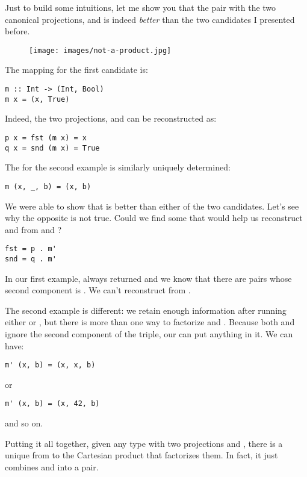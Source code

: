 Just to build some intuitions, let me show you that the pair
 with the two canonical projections, 
and  is indeed \emph{better} than the two candidates I
presented before.

\begin{figure}[H]
\centering
\texttt{[image: images/not-a-product.jpg]}
\end{figure}

\noindent
The mapping  for the first candidate is:

\begin{Verbatim}
m :: Int -> (Int, Bool)
m x = (x, True)
\end{Verbatim}
Indeed, the two projections,  and  can be
reconstructed as:

\begin{Verbatim}
p x = fst (m x) = x
q x = snd (m x) = True
\end{Verbatim}
The  for the second example is similarly uniquely determined:

\begin{Verbatim}
m (x, _, b) = (x, b)
\end{Verbatim}
We were able to show that  is better than either of
the two candidates. Let's see why the opposite is not true. Could we
find some  that would help us reconstruct 
and  from  and ?

\begin{Verbatim}
fst = p . m'
snd = q . m'
\end{Verbatim}
In our first example,  always returned  and we
know that there are pairs whose second component is . We
can't reconstruct  from .

The second example is different: we retain enough information after
running either  or , but there is more than one way
to factorize  and . Because both  and
 ignore the second component of the triple, our 
can put anything in it. We can have:

\begin{Verbatim}
m' (x, b) = (x, x, b)
\end{Verbatim}
or

\begin{Verbatim}
m' (x, b) = (x, 42, b)
\end{Verbatim}
and so on.

Putting it all together, given any type  with two projections
 and , there is a unique  from 
to the Cartesian product  that factorizes them. In fact,
it just combines  and  into a pair.

